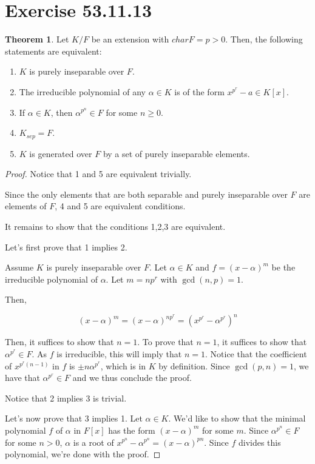 \documentclass{article}
\theoremstyle{definition}
\newtheorem{theorem}{Theorem}[section]
\begin{document}
\newpage

\section{Exercise 53.11.13}

\begin{theorem}\label{characterizations_of_purely_inseparable_extensions}
    Let $K/F$ be an extension with $charF = p > 0$.
    Then, the following statements are equivalent:

    \begin{enumerate}
        \item $K$ is purely inseparable over $F$.
        \item The irreducible polynomial of any $\alpha \in K$ is of the form $x^{p^{r}} - a \in K[x]$.
        \item If $\alpha \in K$, then $\alpha^{p^{n}} \in F$ for some $n \geq 0$.
        \item $K_{sep} = F$.
        \item $K$ is generated over $F$ by a set of purely inseparable elements.
    \end{enumerate}
\end{theorem}
\begin{proof}
    Notice that 1 and 5 are equivalent trivially.

    Since the only elements that are both separable and purely inseparable over $F$
    are elements of $F$, 4 and 5 are equivalent conditions.

    It remains to show that the conditions 1,2,3 are equivalent.

    Let's first prove that 1 implies 2.

    Assume $K$ is purely inseparable over $F$.
    Let $\alpha \in K$ and $f = {(x - \alpha)}^{m}$ be the irreducible
    polynomial of $\alpha$. Let $m = n p ^{r}$ with $\gcd(n,p) = 1$.
    
    Then, 
    
    \[{(x - \alpha)}^{m} = {(x - \alpha)}^{n p ^{r}} = {(x^{p^{r}} - \alpha^{p^{r}})}^{n}\] 

    Then, it suffices to show that $n = 1$. To prove that $n = 1$,
    it suffices to show that $\alpha^{p^{r}} \in F$. As $f$
    is irreducible, this will imply that $n = 1$. Notice that
    the coefficient of $x^{p^{r}(n-1)}$ in $f$ is $\pm n \alpha^{p^{r}}$,
    which is in $K$ by definition. Since $\gcd(p,n) = 1$, we have that
    $\alpha^{p^{r}} \in F$ and we thus conclude the proof.

    Notice that 2 implies 3 is trivial.

    Let's now prove that 3 implies 1.
    Let $\alpha \in K$. We'd like to show that the minimal polynomial $f$ of $\alpha$ in $F[x]$
    has the form ${(x - \alpha)}^m$ for some $m$. Since $\alpha^{p^{n}} \in F$ for some $n > 0$,
    $\alpha$ is a root of $x^{p^{n}} - \alpha^{p^{n}} = (x - \alpha)^{pn}$. Since $f$
    divides this polynomial, we're done with the proof.
\end{proof}
\end{document}

